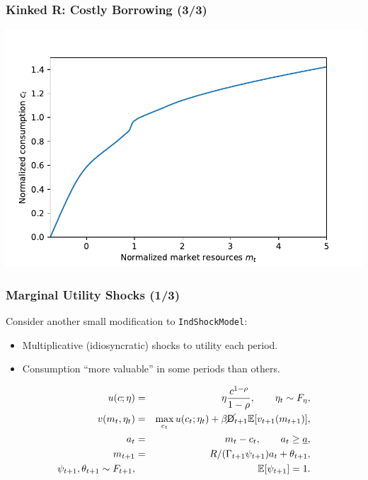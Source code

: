 \documentclass{beamer}
\newcommand{\bi}{\begin{itemize}}
\newcommand{\ei}{\end{itemize}}
\newcommand{\Ex}{\mathbb{E}}
\newcommand{\PDies}{\mathsf{D}}
\newcommand{\PLives}{\cancel{\PDies}}
\begin{document}
\begin{frame}
  \frametitle{Kinked R: Costly Borrowing (3/3)}
  \begin{center}
    \includegraphics[scale=0.75]{KinkedRcFunc.pdf}
  \end{center}
\end{frame}



\begin{frame}
  \frametitle{Marginal Utility Shocks (1/3)}
  Consider another small modification to \texttt{IndShockModel}:
  \bi
\item Multiplicative (idiosyncratic) shocks to utility each period.

\item Consumption ``more valuable'' in some periods than others.
  \ei
  \begin{eqnarray*}
    u(c;\eta) &=& \eta \frac{c^{1-\rho}}{1-\rho}, \qquad \eta_t \sim F_{\eta}, \\
    v(m_t,\eta_t) &=& \max_{c_t} u(c_t;\eta_t) + \beta \PLives_{t+1} \Ex [v_{t+1}(m_{t+1}) ], \\
    a_t &=& m_t - c_t, \qquad a_t \geq \underline{a}, \\
    m_{t+1} &=& R/(\Gamma_{t+1} \psi_{t+1}) a_t + \theta_{t+1}, \\
    \psi_{t+1},\theta_{t+1} \sim F_{t+1}, & & \Ex[\psi_{t+1}] = 1. \\
  \end{eqnarray*}
\end{frame}
\end{document}
